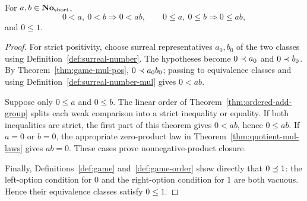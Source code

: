 \begin{theorem}
  \label{thm:quotient-mul-pos}
  \leanok
  For \(a,b\in\mathbf{No}_{\mathrm{short}}\),
  \[
    0<a,\ 0<b\Longrightarrow 0<ab,
    \qquad
    0\leq a,\ 0\leq b\Longrightarrow 0\leq ab,
  \]
  and \(0\leq1\).
\end{theorem}
\begin{proof}
  \leanok
  For strict positivity, choose surreal representatives \(a_0,b_0\) of the
  two classes using Definition~\ref{def:surreal-number}.  The hypotheses become
  \(0\prec a_0\) and \(0\prec b_0\).  By
  Theorem~\ref{thm:game-mul-pos}, \(0\prec a_0b_0\); passing to equivalence
  classes and using Definition~\ref{def:surreal-number-mul} gives \(0<ab\).

  Suppose only \(0\leq a\) and \(0\leq b\).  The linear order of
  Theorem~\ref{thm:ordered-add-group} splits each weak comparison into a strict
  inequality or equality.  If both inequalities are strict, the first part of
  this theorem gives \(0<ab\), hence \(0\leq ab\).  If \(a=0\) or \(b=0\),
  the appropriate zero-product law in Theorem~\ref{thm:quotient-mul-laws}
  gives \(ab=0\).  These cases prove nonnegative-product closure.

  Finally, Definitions~\ref{def:game} and~\ref{def:game-order} show directly
  that \(0\preceq1\): the left-option condition for \(0\) and the right-option
  condition for \(1\) are both vacuous.  Hence their equivalence classes
  satisfy \(0\leq1\).
\end{proof}

